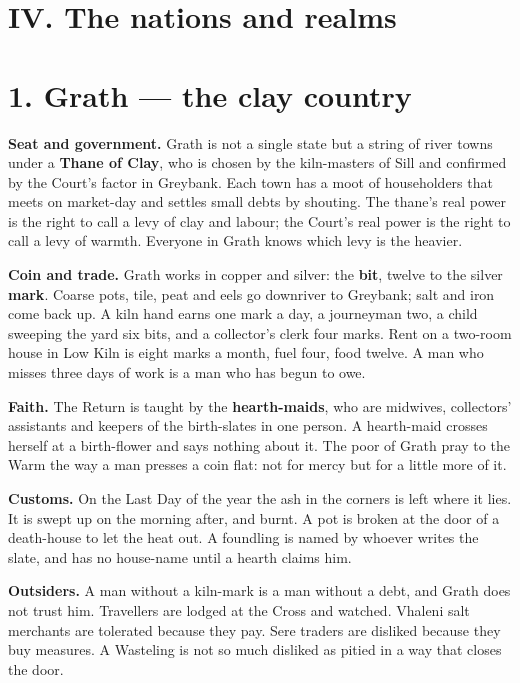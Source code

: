 \documentclass{design/chronicle}
\begin{document}
\CRrule

\section*{IV. The nations and realms}

\section*{1. Grath — the clay country}

\textbf{Seat and government.} Grath is not a single state but a string of river towns under a \textbf{Thane of Clay}, who is chosen by the kiln-masters of Sill and confirmed by the Court’s factor in Greybank. Each town has a moot of householders that meets on market-day and settles small debts by shouting. The thane’s real power is the right to call a levy of clay and labour; the Court’s real power is the right to call a levy of warmth. Everyone in Grath knows which levy is the heavier.

\textbf{Coin and trade.} Grath works in copper and silver: the \textbf{bit}, twelve to the silver \textbf{mark}. Coarse pots, tile, peat and eels go downriver to Greybank; salt and iron come back up. A kiln hand earns one mark a day, a journeyman two, a child sweeping the yard six bits, and a collector’s clerk four marks. Rent on a two-room house in Low Kiln is eight marks a month, fuel four, food twelve. A man who misses three days of work is a man who has begun to owe.

\textbf{Faith.} The Return is taught by the \textbf{hearth-maids}, who are midwives, collectors’ assistants and keepers of the birth-slates in one person. A hearth-maid crosses herself at a birth-flower and says nothing about it. The poor of Grath pray to the Warm the way a man presses a coin flat: not for mercy but for a little more of it.

\textbf{Customs.} On the Last Day of the year the ash in the corners is left where it lies. It is swept up on the morning after, and burnt. A pot is broken at the door of a death-house to let the heat out. A foundling is named by whoever writes the slate, and has no house-name until a hearth claims him.

\textbf{Outsiders.} A man without a kiln-mark is a man without a debt, and Grath does not trust him. Travellers are lodged at the Cross and watched. Vhaleni salt merchants are tolerated because they pay. Sere traders are disliked because they buy measures. A Wasteling is not so much disliked as pitied in a way that closes the door.
\end{document}
